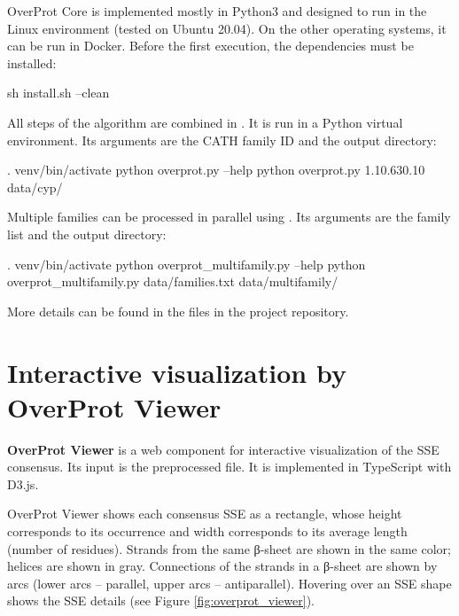 \documentclass{article}
\begin{document}
OverProt Core is implemented mostly in Python3 
and designed to run in the Linux environment (tested on Ubuntu 20.04).
On the other operating systems, it can be run in Docker.
Before the first execution, the dependencies must be installed:

\begin{codeblock}
  sh install.sh --clean
\end{codeblock}

All steps of the algorithm are combined in . 
It is run in a Python virtual environment. 
Its arguments are the CATH family ID and the output directory:

\begin{codeblock}
  . venv/bin/activate
  python overprot.py --help
  python overprot.py 1.10.630.10 data/cyp/
\end{codeblock}

Multiple families can be processed in parallel using . 
Its arguments are the family list and the output directory:

\begin{codeblock}
  . venv/bin/activate
  python overprot_multifamily.py --help
  python overprot_multifamily.py data/families.txt data/multifamily/
\end{codeblock}

More details can be found in the  files 
in the project repository.


\section{Interactive visualization by OverProt Viewer}

\textbf{OverProt Viewer} is a web component for interactive
visualization of the SSE consensus. Its input is the preprocessed
 file. It is implemented in TypeScript with D3.js.

OverProt Viewer shows each consensus SSE as a rectangle, whose height 
corresponds to its occurrence 
and width corresponds to its average length (number of residues). 
Strands from the same β-sheet are shown in the same color; helices are shown in gray. 
Connections of the strands in a β-sheet are shown by arcs 
(lower arcs -- parallel, upper arcs -- antiparallel). 
Hovering over an SSE shape shows the SSE details (see Figure \ref{fig:overprot_viewer}).
\end{document}
